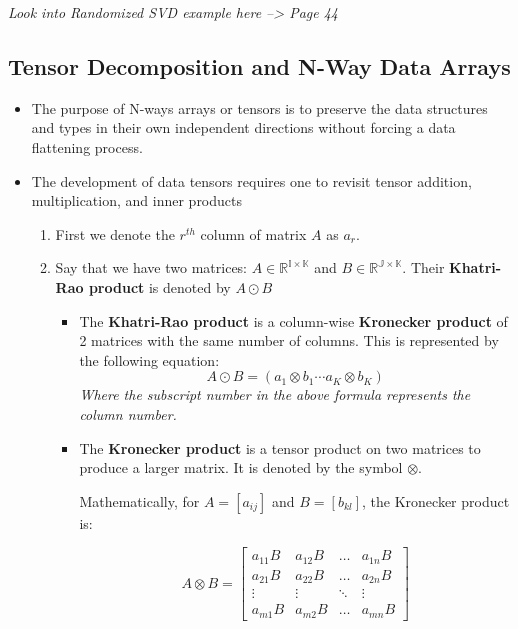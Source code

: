 \documentclass[11.5pt,a4paper]{article}
\begin{document}
\textit{Look into Randomized SVD example here --> Page 44}

\subsection*{Tensor Decomposition and N-Way Data Arrays}

\begin{itemize}
    \item The purpose of N-ways arrays or tensors is to preserve the data structures and types in their own independent directions without forcing a data flattening process.
    \item The development of data tensors requires one to revisit tensor addition, multiplication, and inner products
    \begin{enumerate}
        \item First we denote the $r^{th}$ column of matrix $A$ as $a_r$.
        \item Say that we have two matrices: $A \in \mathbb{R}^{\mathbb{I}\times \mathbb{K}}$ and $B \in \mathbb{R}^{\mathbb{J}\times \mathbb{K}}$. Their \textbf{Khatri-Rao product} is denoted by $A 
        \odot B$
        \begin{itemize}
            \item The \textbf{Khatri-Rao product} is a column-wise \textbf{Kronecker product} of 2 matrices with the same number of columns. This is represented by the following equation:
            \begin{equation*}
                A \odot B = (a_1 \otimes b_1 \cdots a_K \otimes b_K)
            \end{equation*}
            \textit{Where the subscript number in the above formula represents the column number.}
            \item The \textbf{Kronecker product} is a tensor product on two matrices to produce a larger matrix. It is denoted by the symbol $\otimes$.

            Mathematically, for \( A = [a_{ij}] \) and \( B = [b_{kl}] \), the Kronecker product is:

            \[
            A \otimes B = 
            \begin{bmatrix}
            a_{11}B & a_{12}B & \dots & a_{1n}B \\
            a_{21}B & a_{22}B & \dots & a_{2n}B \\
            \vdots & \vdots & \ddots & \vdots \\
            a_{m1}B & a_{m2}B & \dots & a_{mn}B
            \end{bmatrix}
            \]
            

\end{itemize}
\end{enumerate}
\end{itemize}
\end{document}
